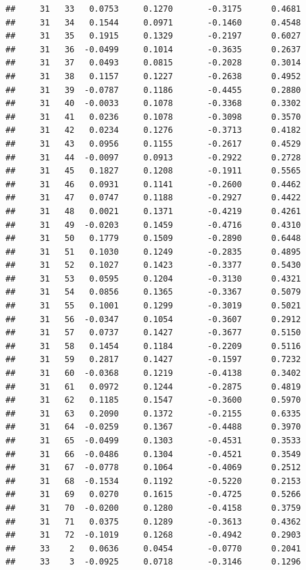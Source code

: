\documentclass[
]{article}
\begin{document}
\begin{verbatim}
##     31   33   0.0753     0.1270       -0.3175      0.4681  
##     31   34   0.1544     0.0971       -0.1460      0.4548  
##     31   35   0.1915     0.1329       -0.2197      0.6027  
##     31   36  -0.0499     0.1014       -0.3635      0.2637  
##     31   37   0.0493     0.0815       -0.2028      0.3014  
##     31   38   0.1157     0.1227       -0.2638      0.4952  
##     31   39  -0.0787     0.1186       -0.4455      0.2880  
##     31   40  -0.0033     0.1078       -0.3368      0.3302  
##     31   41   0.0236     0.1078       -0.3098      0.3570  
##     31   42   0.0234     0.1276       -0.3713      0.4182  
##     31   43   0.0956     0.1155       -0.2617      0.4529  
##     31   44  -0.0097     0.0913       -0.2922      0.2728  
##     31   45   0.1827     0.1208       -0.1911      0.5565  
##     31   46   0.0931     0.1141       -0.2600      0.4462  
##     31   47   0.0747     0.1188       -0.2927      0.4422  
##     31   48   0.0021     0.1371       -0.4219      0.4261  
##     31   49  -0.0203     0.1459       -0.4716      0.4310  
##     31   50   0.1779     0.1509       -0.2890      0.6448  
##     31   51   0.1030     0.1249       -0.2835      0.4895  
##     31   52   0.1027     0.1423       -0.3377      0.5430  
##     31   53   0.0595     0.1204       -0.3130      0.4321  
##     31   54   0.0856     0.1365       -0.3367      0.5079  
##     31   55   0.1001     0.1299       -0.3019      0.5021  
##     31   56  -0.0347     0.1054       -0.3607      0.2912  
##     31   57   0.0737     0.1427       -0.3677      0.5150  
##     31   58   0.1454     0.1184       -0.2209      0.5116  
##     31   59   0.2817     0.1427       -0.1597      0.7232  
##     31   60  -0.0368     0.1219       -0.4138      0.3402  
##     31   61   0.0972     0.1244       -0.2875      0.4819  
##     31   62   0.1185     0.1547       -0.3600      0.5970  
##     31   63   0.2090     0.1372       -0.2155      0.6335  
##     31   64  -0.0259     0.1367       -0.4488      0.3970  
##     31   65  -0.0499     0.1303       -0.4531      0.3533  
##     31   66  -0.0486     0.1304       -0.4521      0.3549  
##     31   67  -0.0778     0.1064       -0.4069      0.2512  
##     31   68  -0.1534     0.1192       -0.5220      0.2153  
##     31   69   0.0270     0.1615       -0.4725      0.5266  
##     31   70  -0.0200     0.1280       -0.4158      0.3759  
##     31   71   0.0375     0.1289       -0.3613      0.4362  
##     31   72  -0.1019     0.1268       -0.4942      0.2903  
##     33    2   0.0636     0.0454       -0.0770      0.2041  
##     33    3  -0.0925     0.0718       -0.3146      0.1296  

\end{verbatim}
\end{document}
